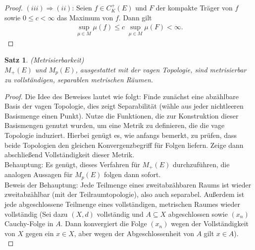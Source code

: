\documentclass[twoside]{article}
\newcounter{lecnum}
\newtheorem{theorem}{Satz}[lecnum]
\theoremstyle{definition}
\begin{document}
\begin{proof}
$(iii) \Longrightarrow (ii)$: Seien $f \in C_K^+(E)$ und $F$ der kompakte Träger von $f$ sowie $0 \leq c < \infty$ das Maximum von $f$. Dann gilt
\begin{align}
\sup_{\mu \in M} \mu(f) \leq c \; \sup_{\mu \in M} \mu(F) < \infty.
\end{align}
\end{proof}
\begin{theorem} (Metrisierbarkeit)\\
$M_+(E)$ und $M_p(E)$, ausgestattet mit der vagen Topologie, sind metrisierbar zu vollständigen, separablen metrischen Räumen.
\end{theorem}

\begin{proof} Die Idee des Beweises lautet wie folgt: Finde zunächst eine abzählbare Basis der vagen Topologie, dies zeigt Separabilität (wähle aus jeder nichtleeren Basismenge einen Punkt). Nutze die Funktionen, die zur Konstruktion dieser Basismengen genutzt wurden, um eine Metrik zu definieren, die die vage Topologie induziert. Hierbei genügt es, wie anfangs bemerkt, zu prüfen, dass beide Topologien den gleichen Konvergenzbegriff für Folgen liefern. Zeige dann abschließend Vollständigkeit dieser Metrik.\\

Behauptung: Es genügt, dieses Verfahren für $M_+(E)$ durchzuführen, die analogen Aussagen für $M_p(E)$ folgen dann sofort.\\

Beweis der Behauptung: Jede Teilmenge eines zweitabzähbaren Raums ist wieder zweitabzählbar (mit der Teilraumtopologie), also auch separabel. Außerdem ist jede abgeschlossene Teilmenge eines vollständigen, metrischen Raumes wieder vollständig (Sei dazu $(X,d)$ vollständig und $A \subseteq X$ abgeschlossen sowie $(x_n)$ Cauchy-Folge in $A$. Dann konvergiert die Folge $(x_n)$ wegen der Vollständigkeit von $X$ gegen ein $x \in X$, aber wegen der Abgeschlossenheit von $A$ gilt $x \in A$).\\


\end{proof}
\end{document}
